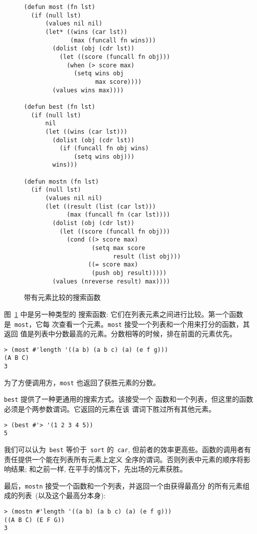 \begin{figure}
\begin{lstlisting}
(defun most (fn lst)
  (if (null lst)
      (values nil nil)
      (let* ((wins (car lst))
             (max (funcall fn wins)))
        (dolist (obj (cdr lst))
          (let ((score (funcall fn obj)))
            (when (> score max)
              (setq wins obj
                    max score))))
        (values wins max))))

(defun best (fn lst)
  (if (null lst)
      nil
      (let ((wins (car lst)))
        (dolist (obj (cdr lst))
          (if (funcall fn obj wins)
              (setq wins obj)))
        wins)))

(defun mostn (fn lst)
  (if (null lst)
      (values nil nil)
      (let ((result (list (car lst)))
            (max (funcall fn (car lst))))
        (dolist (obj (cdr lst))
          (let ((score (funcall fn obj)))
            (cond ((> score max)
                   (setq max score
                         result (list obj)))
                  ((= score max)
                   (push obj result)))))
        (values (nreverse result) max))))
\end{lstlisting}
\caption{\label{fig:search_functions_which_compare_elements}
  带有元素比较的搜索函数}
\end{figure}

图~\ref{fig:search_functions_which_compare_elements} 中是另一种类型的
搜索函数: 它们在列表元素之间进行比较。第一个函数是~\texttt{most}，它每
次查看一个元素。\texttt{most} 接受一个列表和一个用来打分的函数，其返回
值是列表中分数最高的元素。分数相等的时候，排在前面的元素优先。
\begin{lstlisting}
> (most #'length '((a b) (a b c) (a) (e f g)))
(A B C)
3
\end{lstlisting}
为了方便调用方，\texttt{most} 也返回了获胜元素的分数。

\texttt{best} 提供了一种更通用的搜索方式。该\utility{}接受一个
函数和一个列表，但这里的函数必须是个两参数谓词。它返回的元素在该
谓词下胜过所有其他元素。
\begin{lstlisting}
> (best #'> '(1 2 3 4 5))
5
\end{lstlisting}
我们可以认为~\texttt{best} 等价于~\texttt{sort} 的~\texttt{car},
但前者的效率更高些。函数的调用者有责任提供一个能在列表所有元素上定义
全序的谓词。否则列表中元素的顺序将影响结果; 和之前一样,
在平手的情况下，先出场的元素获胜。

最后，\texttt{mostn} 接受一个函数和一个列表，并返回一个由获得最高分
的所有元素组成的列表~(以及这个最高分本身):
\begin{lstlisting}
> (mostn #'length '((a b) (a b c) (a) (e f g)))
((A B C) (E F G))
3
\end{lstlisting}

